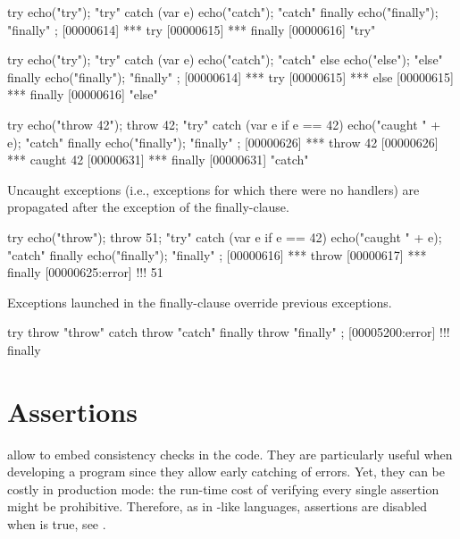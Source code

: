 \begin{urbiscript}
try           { echo("try");     "try" }
catch (var e) { echo("catch");   "catch" }
finally       { echo("finally"); "finally" };
[00000614] *** try
[00000615] *** finally
[00000616] "try"

try           { echo("try");     "try" }
catch (var e) { echo("catch");   "catch" }
else          { echo("else");    "else" }
finally       { echo("finally"); "finally" };
[00000614] *** try
[00000615] *** else
[00000615] *** finally
[00000616] "else"

try                      { echo("throw 42"); throw 42; "try" }
catch (var e if e == 42) { echo("caught " + e);        "catch" }
finally                  { echo("finally");            "finally" };
[00000626] *** throw 42
[00000626] *** caught 42
[00000631] *** finally
[00000631] "catch"
\end{urbiscript}


Uncaught exceptions (i.e., exceptions for which there were no handlers) are
propagated after the exception of the finally-clause.

\begin{urbiscript}
try                      { echo("throw"); throw 51; "try" }
catch (var e if e == 42) { echo("caught " + e);     "catch" }
finally                  { echo("finally");         "finally" };
[00000616] *** throw
[00000617] *** finally
[00000625:error] !!! 51
\end{urbiscript}

Exceptions launched in the finally-clause override previous exceptions.

\begin{urbiscript}
try     { throw "throw" }
catch   { throw "catch" }
finally { throw "finally" };
[00005200:error] !!! finally
\end{urbiscript}



\section{Assertions}
\label{sec:lang:assert}



 allow to embed consistency checks in the code.
They are particularly useful when developing a program since they allow
early catching of errors.  Yet, they can be costly in production mode: the
run-time cost of verifying every single assertion might be prohibitive.
Therefore, as in \langC-like languages, assertions are disabled when
 is true, see .

